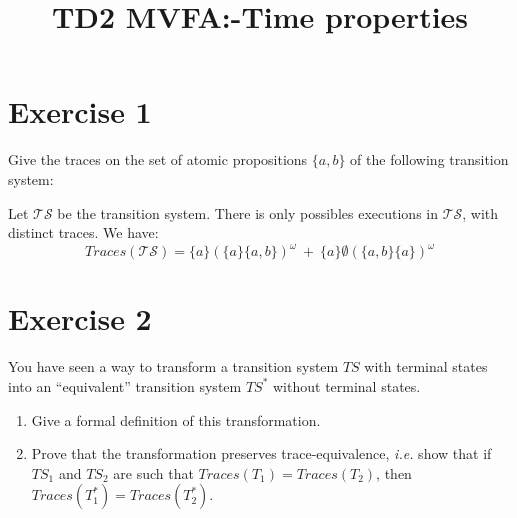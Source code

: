 \documentclass[11pt,a4paper]{article}
\title{TD2 MVFA:\@Linear-Time properties}
\date{}
\def\ts{\mathcal{TS}}
\def\traces{\mathit{Traces}}
\def\seta{\{a\}}
\def\setab{\{a,b\}}
\begin{document}
\maketitle

\section*{Exercise 1}

Give the traces on the set of atomic propositions $\{a,b\}$ of the following transition system:

\begin{center}
\end{center}

\begin{Answer}[number=1]
Let $\ts$ be the transition system. There is only possibles executions in $\ts$, with distinct traces.
We have:
$$\traces(\ts)=\seta{(\seta\setab)}^\omega\ +\ \seta\emptyset{(\setab\seta)}^\omega$$
\end{Answer}

\section*{Exercise 2}

You have seen a way to transform a transition system $TS$ with terminal states into an ``equivalent'' transition system $TS^*$ without terminal states.

\begin{enumerate}
	\item Give a formal definition of this transformation.
	\item Prove that the transformation preserves trace-equivalence, \textit{i.e.} show that if $TS_1$ and $TS_2$ are such that $Traces(T_1) = Traces(T_2)$, then $Traces(T_1^*) = Traces(T_2^*)$.
\end{enumerate}
\end{document}
